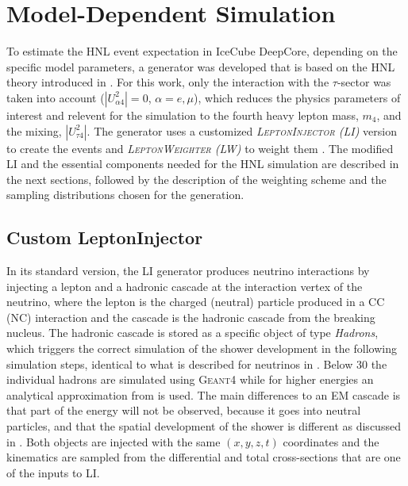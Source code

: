 \section{Model-Dependent Simulation} 

To estimate the HNL event expectation in IceCube DeepCore, depending on the specific model parameters, a generator was developed that is based on the HNL theory introduced in . For this work, only the interaction with the $\tau$-sector was taken into account ($|U_{\alpha4}^2|=0$, $\alpha=e,\mu$), which reduces the physics parameters of interest and relevent for the simulation to the fourth heavy lepton mass, $m_4$, and the mixing, $|U_{\tau4}^2|$. The generator uses a customized \textit{\textsc{LeptonInjector} (LI)} version to create the events and \textit{\textsc{LeptonWeighter} (LW)} to weight them . The modified LI and the essential components needed for the HNL simulation are described in the next sections, followed by the description of the weighting scheme and the sampling distributions chosen for the generation.


\subsection{Custom LeptonInjector} 

In its standard version, the LI generator produces neutrino interactions by injecting a lepton and a hadronic cascade at the interaction vertex of the neutrino, where the lepton is the charged (neutral) particle produced in a CC (NC) interaction and the cascade is the hadronic cascade from the breaking nucleus. The hadronic cascade is stored as a specific object of type \textit{Hadrons}, which triggers the correct simulation of the shower development in the following simulation steps, identical to what is described for neutrinos in . Below \SI{30}{\gev} the individual hadrons are simulated using \textsc{Geant4}  while for higher energies an analytical approximation from  is used. The main differences to an EM cascade is that part of the energy will not be observed, because it goes into neutral particles, and that the spatial development of the shower is different as discussed in . Both objects are injected with the same $(x,y,z,t)$ coordinates and the kinematics are sampled from the differential and total cross-sections that are one of the inputs to LI.

